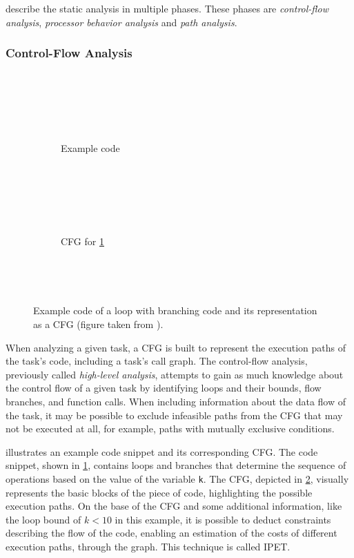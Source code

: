 \textcite{wilhelmWorstcaseExecutiontimeProblem2008} describe the static analysis in multiple phases.
These phases are \textit{control-flow analysis}, \textit{processor behavior analysis} and \textit{path analysis}.

\subsubsection{Control-Flow Analysis}\label{sec:cfa}

\begin{figure}[h]
    \begin{subfigure}[c]{0.45\textwidth}
        
        \caption{Example code}
        \label{fig:cfg_code}
    \end{subfigure}
    \hfill
    \begin{subfigure}[c]{0.45\textwidth}
        
        \caption{\ac{CFG} for \cref{fig:cfg_code}}
        \label{fig:cfg}
    \end{subfigure}
    \caption{Example code of a loop with branching code and its representation as a \ac{CFG} (figure taken from \cite{liCacheModelingRealtime1996}).}
    \label{fig:code_and_cfg}
\end{figure}

When analyzing a given task, a \ac{CFG} is built to represent the execution paths of the task's code, including a task's call graph. The control-flow analysis, previously called \textit{high-level analysis}, attempts to gain as much knowledge about the control flow of a given task by identifying loops and their bounds, flow branches, and function calls. When including information about the data flow of the task, it may be possible to exclude infeasible paths from the \ac{CFG} that may not be executed at all, for example, paths with mutually exclusive conditions. 

 illustrates an example code snippet and its corresponding \ac{CFG}. 
The code snippet, shown in \cref{fig:cfg_code}, contains loops and branches that determine the sequence of operations based on the value of the variable \texttt{k}. 
The \ac{CFG}, depicted in \cref{fig:cfg}, visually represents the basic blocks of the piece of code, highlighting the possible execution paths.
On the base of the \ac{CFG} and some additional information, like the loop bound of $k<10$ in this example, it is possible to deduct constraints describing the flow of the code, enabling an estimation of the costs of different execution paths, through the graph\cite{liCacheModelingRealtime1996,wilhelmWorstcaseExecutiontimeProblem2008}.
This technique is called \ac{IPET}\cite{wilhelmWorstcaseExecutiontimeProblem2008}.

